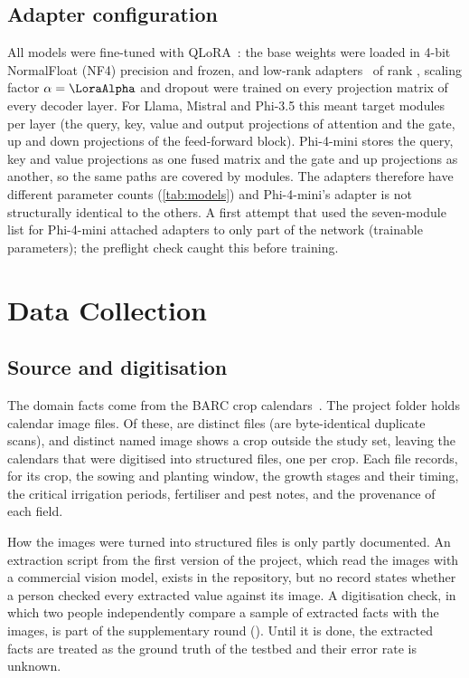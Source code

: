 \subsection{Adapter configuration}
\label{sec:adapter-config}

All models were fine-tuned with QLoRA~\cite{dettmers2023qlora}: the base weights were loaded in 4-bit NormalFloat (NF4) precision and frozen, and low-rank adapters~\cite{hu2022lora} of rank \LoraRank, scaling factor $\alpha = \LoraAlpha$ and dropout \LoraDropout were trained on every projection matrix of every decoder layer. For Llama, Mistral and Phi-3.5 this meant \LlamaLoraTargets target modules per layer (the query, key, value and output projections of attention and the gate, up and down projections of the feed-forward block). Phi-4-mini stores the query, key and value projections as one fused matrix and the gate and up projections as another, so the same paths are covered by \PhiFourLoraTargets modules. The adapters therefore have different parameter counts (\cref{tab:models}) and Phi-4-mini's adapter is not structurally identical to the others. A first attempt that used the seven-module list for Phi-4-mini attached adapters to only part of the network (\PhiFourBrokenAdapterParams trainable parameters); the preflight check caught this before training.

\section{Data Collection}
\label{sec:data-collection}

\subsection{Source and digitisation}
\label{sec:source}

The domain facts come from the BARC crop calendars~\cite{barc2026cropcalendar}. The project folder holds \CalendarImageFiles calendar image files. Of these, \CalendarImageUnique are distinct files (\CalendarImageDuplicates are byte-identical duplicate scans), and \CalendarImageOutsideStudy distinct named image shows a crop outside the study set, leaving the \SourceFiles calendars that were digitised into \CalendarJsonFiles structured files, one per crop. Each file records, for its crop, the sowing and planting window, the growth stages and their timing, the critical irrigation periods, fertiliser and pest notes, and the provenance of each field.

How the images were turned into structured files is only partly documented. An extraction script from the first version of the project, which read the images with a commercial vision model, exists in the repository, but no record states whether a person checked every extracted value against its image. A digitisation check, in which two people independently compare a sample of extracted facts with the images, is part of the supplementary round (). Until it is done, the extracted facts are treated as the ground truth of the testbed and their error rate is unknown.


